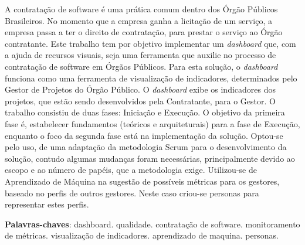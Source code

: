 \begin{resumo}
A contratação de software é uma prática comum dentro dos Órgão Públicos Brasileiros. No momento que a empresa ganha a licitação de um serviço, a empresa passa a ter o direito de contratação, para prestar o serviço ao Órgão contratante. Este trabalho tem por objetivo implementar um \textit{dashboard} que, com a ajuda de recursos visuais, seja uma ferramenta que auxilie no processo de contratação de software em Órgãos Públicos. Para esta solução, o \textit{dashboard} funciona como uma ferramenta de visualização de indicadores, determinados pelo Gestor de Projetos do Órgão Público. O \textit{dashboard} exibe os indicadores dos projetos, que estão sendo desenvolvidos pela Contratante, para o Gestor. O trabalho consistiu de duas fases: Iniciação e Execução. O objetivo da primeira fase é, estabelecer fundamentos (teóricos e arquiteturais) para a fase de Execução, enquanto o foco da segunda fase está na implementação da solução. Optou-se pelo uso, de uma adaptação da metodologia Scrum para o desenvolvimento da solução, contudo algumas mudanças foram necessárias, principalmente devido ao escopo e ao número de papéis, que a metodologia exige. Utilizou-se de Aprendizado de Máquina na sugestão de possíveis métricas para os gestores, baseado no perfis de outros gestores. Neste caso criou-se personas para representar estes perfis.
 \vspace{\onelineskip}
 
    
 \noindent
 \textbf{Palavras-chaves}: dashboard. qualidade. contratação de software. monitoramento de métricas. visualização de indicadores. aprendizado de maquina. personas.

\end{resumo}
